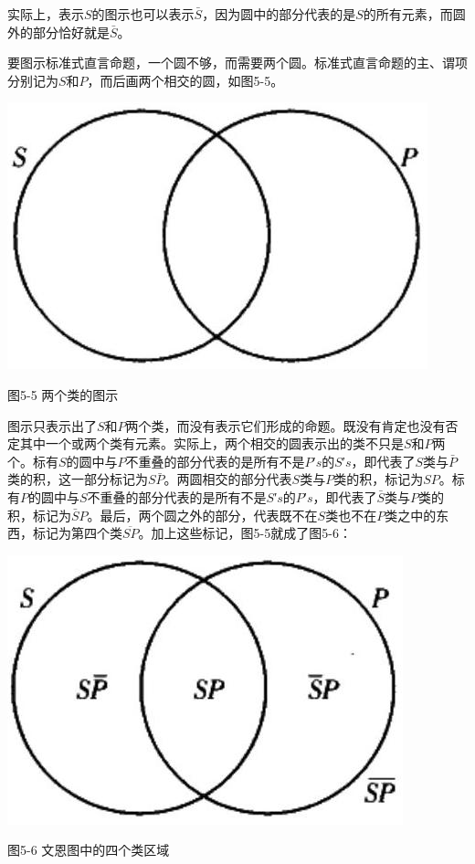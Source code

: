 实际上，表示$S$的图示也可以表示$\bar{S}$，因为圆中的部分代表的是$S$的所有元素，而圆外的部分恰好就是$\bar{S}$。

要图示标准式直言命题，一个圆不够，而需要两个圆。标准式直言命题的主、谓项分别记为$S$和$P$，而后画两个相交的圆，如图5-5。

\begin{center}
\includegraphics[width=\textwidth]{images/2025_05_15_6a28331d5e7c993ad07ag-258.jpg}

图5-5 两个类的图示
\end{center}

图示只表示出了$S$和$P$两个类，而没有表示它们形成的命题。既没有肯定也没有否定其中一个或两个类有元素。实际上，两个相交的圆表示出的类不只是$S$和$P$两个。标有$S$的圆中与$P$不重叠的部分代表的是所有不是$P$′$s$的$S$′$s$，即代表了$S$类与$\bar{P}$类的积，这一部分标记为$S\bar{P}$。两圆相交的部分代表$S$类与$P$类的积，标记为$SP$。标有$P$的圆中与$S$不重叠的部分代表的是所有不是$S$′$s$的$P$′$s$，即代表了$\bar{S}$类与$P$类的积，标记为$\bar{S}P$。最后，两个圆之外的部分，代表既不在$S$类也不在$P$类之中的东西，标记为第四个类$\overline{SP}$。加上这些标记，图5-5就成了图5-6：

\begin{center}
\includegraphics[width=\textwidth]{images/2025_05_15_6a28331d5e7c993ad07ag-258(1).jpg}

图5-6 文恩图中的四个类区域
\end{center}

